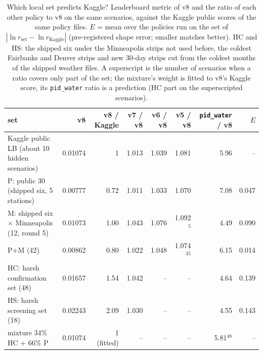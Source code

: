 \begin{table}[!htbp]
\caption{Which local set predicts Kaggle? Leaderboard metric of v8 and the ratio of each other policy to v8 on the same scenarios, against the Kaggle public scores of the same policy files. $E$ = mean over the policies run on the set of $|\ln r_{\text{set}} - \ln r_{\text{Kaggle}}|$ (pre-registered shape error; smaller matches better). HC and HS: the shipped six under the Minneapolis strips not used before, the coldest Fairbanks and Denver strips and new 30-day strips cut from the coldest months of the shipped weather files. A superscript is the number of scenarios when a ratio covers only part of the set; the mixture's weight is fitted to v8's Kaggle score, its \texttt{pid\_water} ratio is a prediction (HC part on the superscripted scenarios).}
\label{tab:kaggle}
\centering\scriptsize
\setlength{\tabcolsep}{3.5pt}
\begin{tabular}{lrrrrrrr}
\toprule
set & v8 & v8 / Kaggle & v7 / v8 & v6 / v8 & v5 / v8 & \texttt{pid\_water} / v8 & $E$ \\
\midrule
Kaggle public LB (about 10 hidden scenarios) & 0.01074 & 1 & 1.013 & 1.039 & 1.081 & 5.96 & -- \\
\midrule
P: public 30 (shipped six, 5 stations) & 0.00777 & 0.72 & 1.011 & 1.033 & 1.070 & 7.08 & 0.047 \\
M: shipped six $\times$ Minneapolis (12, round 5) & 0.01073 & 1.00 & 1.043 & 1.076 & 1.092$^{5}$ & 4.49 & 0.090 \\
P+M (42) & 0.00862 & 0.80 & 1.022 & 1.048 & 1.074$^{35}$ & 6.15 & 0.014 \\
HC: harsh confirmation set (48) & 0.01657 & 1.54 & 1.042 & -- & -- & 4.64 & 0.139 \\
HS: harsh screening set (18) & 0.02243 & 2.09 & 1.030 & -- & -- & 4.55 & 0.143 \\
mixture 34\% HC + 66\% P & 0.01074 & 1 (fitted) & -- & -- & -- & 5.81$^{48}$ & -- \\
\bottomrule
\end{tabular}
\end{table}
